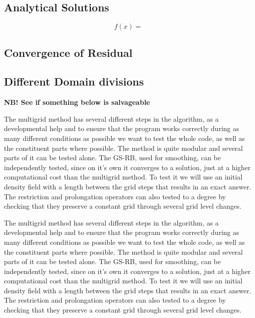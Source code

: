 \subsection{Analytical Solutions}

		\begin{equation}
			f(x) =
		\end{equation}


\subsection{Convergence of Residual}

\subsection{Different Domain divisions}



\textbf{NB! See if something below is salvageable}


The multigrid method has several different steps in the algorithm, as a developmental
help and to ensure that the program works correctly during as many different conditions
as possible we want to test the whole code, as well as the constituent parts where possible.
The method is quite modular and several parts of it can be tested alone.
The GS-RB, used for smoothing, can be independently tested, since on it's own it converges to a solution,
just at a higher computational cost than the multigrid method. To test it we will
use an initial density field with a length between the grid steps that results in
an exact answer. The restriction and prolongation operators can also tested to a
degree by checking that they preserve a constant grid through several grid level changes.


The multigrid method has several different steps in the algorithm, as a developmental
help and to ensure that the program works correctly during as many different conditions
as possible we want to test the whole code, as well as the constituent parts where possible.
The method is quite modular and several parts of it can be tested alone.
The GS-RB, used for smoothing, can be independently tested, since on it's own it converges to a solution,
just at a higher computational cost than the multigrid method. To test it we will
use an initial density field with a length between the grid steps that results in
an exact answer. The restriction and prolongation operators can also tested to a
degree by checking that they preserve a constant grid through several grid level changes.

